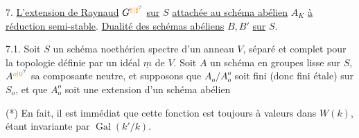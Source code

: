 7. \uline{L'extension de Raynaud} $G^{\handwritten{\unsure{\natural|\sharp}}}$ \uline{sur} $S$ \uline{attachée au schéma abélien} $A_K$ \uline{à réduction semi-stable}. \uline{Dualité des schémas abéliens} $B,B'$ \uline{sur} $S$.

7.1. Soit $S$ un schéma noethérien spectre d'un anneau $V$, séparé et complet pour la topologie définie par un idéal $\underline m$ de $V$. Soit $A$ un schéma en groupes lisse sur $S$, $A^{\unsure{o|0}}$ sa composante neutre, et supposons que $A_o/A_o^o$ soit fini (donc fini étale) sur $S_o$, et que $A_o^o$ soit une extension d'un schéma abélien

\noindent (*) En fait, il est immédiat que cette fonction est toujours à valeurs dans $W(k)$, étant invariante par $\operatorname{Gal}(k'/k)$.






